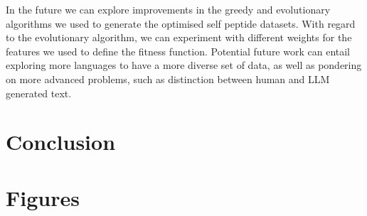 \documentclass{article}
\begin{document}
In the future we can explore improvements in the greedy and evolutionary algorithms we used to generate the optimised 
self peptide datasets. With regard to the evolutionary algorithm, we can experiment with different weights for the
features we used to define the fitness function. Potential future work can entail exploring more languages to have a 
more diverse set of data, as well as pondering on more advanced problems, such as distinction between human and LLM
generated text.

\section{Conclusion}


\printbibliography

\appendix
\section{Figures}
\end{document}
